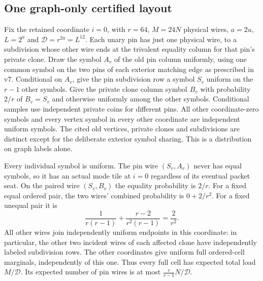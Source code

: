 \documentclass[11pt,a4paper]{article}
\begin{document}
\subsection{One graph-only certified
layout}\label{v9-one-graph-only-certified-layout}

Fix the retained coordinate \(i=0\), with \(r=64\), \(M=24N\) physical
wires, \(a=2u\), \(L=2^a\) and \(\mathcal D=r^{2a}=L^{12}\). Each unary
pin has just one physical wire, to a subdivision whose other wire ends
at the trivalent equality column for that pin's private clone. Draw the
symbol \(A_v\) of the old pin column uniformly, using one common symbol
on the two pins of each exterior matching edge as prescribed in v7.
Conditional on \(A_v\), give the pin subdivision row a symbol \(S_v\)
uniform on the \(r-1\) other symbols. Give the private clone column
symbol \(B_v\) with probability \(2/r\) of \(B_v=S_v\) and otherwise
uniformly among the other symbols. Conditional samples use independent
private coins for different pins. All other coordinate-zero symbols and
every vertex symbol in every other coordinate are independent uniform
symbols. The cited old vertices, private clones and subdivisions are
distinct except for the deliberate exterior symbol sharing. This is a
distribution on graph labels alone.

Every individual symbol is uniform. The pin wire \((S_v,A_v)\) never has
equal symbols, so it has an actual mode tile at \(i=0\) regardless of
its eventual packet seat. On the paired wire \((S_v,B_v)\) the equality
probability is \(2/r\). For a fixed equal ordered pair, the two wires'
combined probability is \(0+2/r^2\). For a fixed unequal pair it is \[
          \frac1{r(r-1)}+\frac{r-2}{r^2(r-1)}=\frac2{r^2}.
\] All other wires join independently uniform endpoints in this
coordinate: in particular, the other two incident wires of each affected
clone have independently labeled subdivision rows. The other coordinates
give uniform full ordered-cell marginals, independently of this one.
Thus every full cell has expected total load \(M/\mathcal D\). Its
expected number of pin wires is at most \(\frac{r}{r-1}N/\mathcal D\).
\end{document}
